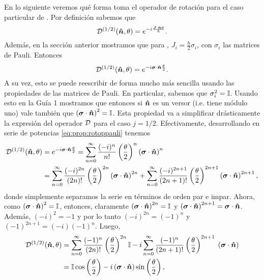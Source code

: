 \documentclass[10pt, a4paper]{article}
\numberwithin{equation}{subsection}
\begin{document}
En lo siguiente veremos qué forma toma el operador de rotación para el caso
particular de \spinhalf. Por definición sabemos que
\begin{equation}
  \RotationOp[1/2](\vers{n},\theta) =
    e^{-i\frac{\vect{J}\cdot\vers{n}\theta}{\hbar}}.
\end{equation}
Además, en la sección anterior mostramos que para \spinhalf, $J_i =
\frac{\hbar}{2}\sigma_i$, con $\sigma_i$ las matrices de Pauli. Entonces
\begin{equation} \label{eq:prop:rotoppauli}
  \RotationOp[1/2](\vers{n},\theta) =
    e^{-i\vect{\sigma}\cdot\vers{n}\frac{\theta}{2}}.
\end{equation}
A su vez, esto se puede reescribir de forma mucho más sencilla usando las
propiedades de las matrices de Pauli. En particular, sabemos que $\sigma_i^2 =
\mathbb{I}$. Usando esto en la Guía 1 mostramos que entonces si $\vu*{n}$ es un
versor (i.e. tiene módulo uno) vale también que
$\left(\vb*{\sigma}\cdot\vu*{n}\right)^2 = \mathbb{I}$. Esta propiedad va a
simplificar drásticamente la expresión del operador $\RotationOp$ para el caso
$j = 1/2$. Efectivamente, desarrollando en serie de potencias
\eqref{eq:prop:rotoppauli} tenemos
\begin{align}
  \RotationOp[1/2](\vers{n},\theta) &= 
    e^{-i\vect{\sigma}\cdot\vers{n}\frac{\theta}{2}} =
    \sum_{n=0}^\infty \frac{(-i)^n}{n!}\left(\frac{\theta}{2}\right)^n
      \left(\vect{\sigma}\cdot\vers{n}\right)^n \nonumber \\ &=
  \sum_{n=0}^\infty \frac{(-i)^{2n}}{(2n)!}\left(\frac{\theta}{2}\right)^{2n}
    \left(\vect{\sigma}\cdot\vers{n}\right)^{2n} +
  \sum_{n=0}^\infty \frac{(-i)^{2n+1}}{(2n+1)!}\left(\frac{\theta}{2}\right)^{2n+1}
      \left(\vect{\sigma}\cdot\vers{n}\right)^{2n+1},
\end{align}
donde simplemente separamos la serie en términos de orden par e impar.
Ahora, como $\left(\vb*{\sigma}\cdot\vu*{n}\right)^2 = \mathbb{I}$, entonces,
claramente $\left(\vb*{\sigma}\cdot\vu*{n}\right)^{2n} = \mathbb{I}$ y
$\left(\vb*{\sigma}\cdot\vu*{n}\right)^{2n+1} =
\vb*{\sigma}\cdot\vu*{n}$. Además, $(-i)^2 = -1$ y por lo tanto $(-i)^{2n} =
(-1)^n$ y $(-1)^{2n+1} = (-i)(-1)^n$. Luego,
\begin{align}
  \RotationOp[1/2](\vers{n},\theta) &= 
    \sum_{n=0}^\infty \frac{(-1)^n}{(2n)!}\left(\frac{\theta}{2}\right)^{2n}
      \Id
    -i \sum_{n=0}^\infty \frac{(-1)^n}{(2n+1)!}\left(\frac{\theta}{2}\right)^{2n+1}
      \;\left(\vect{\sigma}\cdot\vers{n}\right) \nonumber \\ &=
    \Id\cos\left(\frac{\theta}{2}\right)
    -i\left(\vect{\sigma}\cdot\vers{n}\right)\sin\left(\frac{\theta}{2}\right),
    \label{eq:prop:rotop2d}
\end{align}
\end{document}
